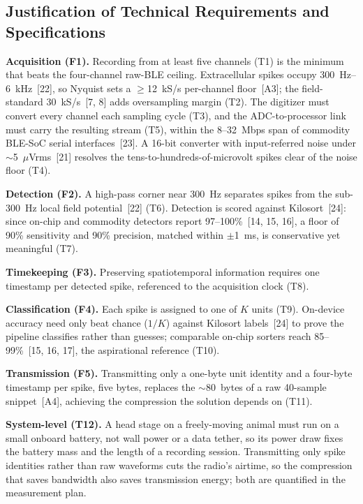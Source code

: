 \documentclass[11pt]{article}
\begin{document}
\subsection{Justification of Technical Requirements and Specifications}
\textbf{Acquisition (F1).} Recording from at least five channels (T1) is the minimum that
beats the four-channel raw-BLE ceiling. Extracellular spikes occupy 300~Hz--6~kHz~[22], so
Nyquist sets a $\geq$12~kS/s per-channel floor~[A3]; the field-standard 30~kS/s~[7, 8] adds
oversampling margin (T2). The digitizer must convert every channel each sampling cycle (T3),
and the ADC-to-processor link must carry the resulting stream (T5), within the 8--32~Mbps
span of commodity BLE-SoC serial interfaces~[23]. A 16-bit converter with input-referred
noise under $\sim$5~$\mu$Vrms~[21] resolves the tens-to-hundreds-of-microvolt spikes clear of
the noise floor (T4).

\textbf{Detection (F2).} A high-pass corner near 300~Hz separates spikes from the sub-300~Hz
local field potential~[22] (T6). Detection is scored against Kilosort~[24]: since on-chip and
commodity detectors report 97--100\%~[14, 15, 16], a floor of 90\% sensitivity and 90\%
precision, matched within $\pm$1~ms, is conservative yet meaningful (T7).

\textbf{Timekeeping (F3).} Preserving spatiotemporal information requires one timestamp per
detected spike, referenced to the acquisition clock (T8).

\textbf{Classification (F4).} Each spike is assigned to one of $K$ units (T9). On-device
accuracy need only beat chance ($1/K$) against Kilosort labels~[24] to prove the pipeline
classifies rather than guesses; comparable on-chip sorters reach 85--99\%~[15, 16, 17], the
aspirational reference (T10).

\textbf{Transmission (F5).} Transmitting only a one-byte unit identity and a four-byte
timestamp per spike, five bytes, replaces the $\sim$80~bytes of a raw 40-sample snippet~[A4],
achieving the compression the solution depends on (T11).

\textbf{System-level (T12).} A head stage on a freely-moving animal must run on a small
onboard battery, not wall power or a data tether, so its power draw fixes the battery mass
and the length of a recording session. Transmitting only spike identities rather than raw
waveforms cuts the radio's airtime, so the compression that saves bandwidth also saves
transmission energy; both are quantified in the measurement plan.
\end{document}
